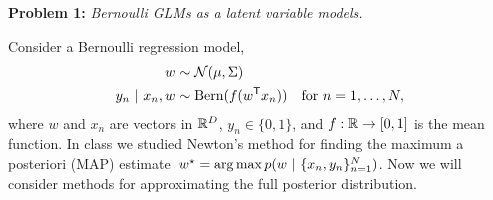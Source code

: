 
\textbf{Problem 1:} \textit{Bernoulli GLMs as a latent variable models.}

Consider a Bernoulli regression model,
\begin{align*}
    w &\sim \mathcal{N}(\mu, \Sigma) \\
    y_n ~\vert~ x_n, w &\sim \mathrm{Bern}(f(w^{\mathsf{T}} x_n)) \quad \text{for } n = 1,\ldots, N,
\end{align*}
where $w$ and $x_n$ are vectors in $\mathbb{R}^D$, $y_n \in \{0, 1\}$, and $f: \mathbb{R} \to [0, 1]$ is the mean function. In class we studied Newton's method for finding the maximum a posteriori (MAP) estimate~$w^\star = \operatorname*{arg\,max} p(w ~\vert~ \{x_n, y_n\}_{n=1}^N)$.  Now we will consider methods for approximating the full posterior distribution.

